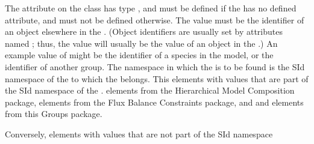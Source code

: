 The attribute  on the \Member class has type , and must be defined if the \Member has no defined  attribute, and must not be defined otherwise.  The value must be the identifier of an object elsewhere in the \Model.  (Object identifiers are usually set by attributes named ; thus, the  value will usually be the  value of an object in the \Model.)  An example value of  might be the identifier of a species in the model, or the identifier of another group.  The namespace in which the  is to be found is the SId namespace of the \Model to which the \Group belongs.  This  elements with  values that are part of the SId namespace of the \Model.   \Deletion elements from the Hierarchical Model Composition package, \FluxBound elements from the Flux Balance Constraints package, and \Group and \Member elements from this Groups package.

Conversely, elements with  values that are not part of the SId namespace 


